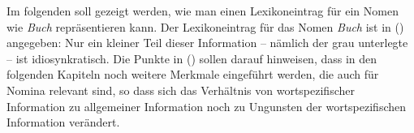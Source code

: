 Im folgenden soll gezeigt werden, wie man einen Lexikoneintrag für ein Nomen wie \emph{Buch} repräsentieren
kann. Der Lexikoneintrag für das Nomen \emph{Buch} ist in () angegeben:
\ea
{}
\z
Nur ein kleiner Teil dieser Information -- nämlich der grau unterlegte -- ist idiosynkratisch.
Die Punkte in () sollen darauf hinweisen, dass in den folgenden Kapiteln noch weitere Merkmale
eingeführt werden, die auch für Nomina relevant sind, so dass sich das Verhältnis von wortspezifischer
Information zu allgemeiner Information noch zu Ungunsten der wortspezifischen Information
verändert.

